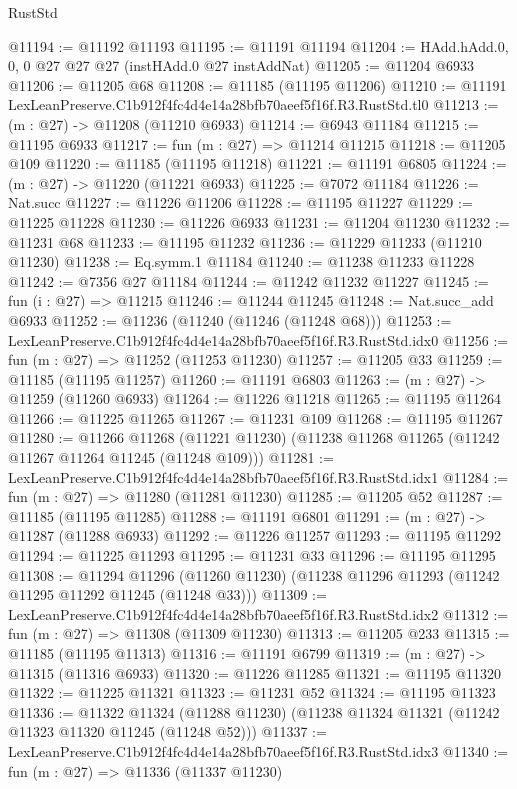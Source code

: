 \begin{lexlean}{RustStd}
\begin{coremodule}
@11194 := @11192 @11193
@11195 := @11191 @11194
@11204 := HAdd.hAdd.{0, 0, 0} @27 @27 @27 (instHAdd.{0} @27 instAddNat)
@11205 := @11204 @6933
@11206 := @11205 @68
@11208 := @11185 (@11195 @11206)
@11210 := @11191 LexLeanPreserve.C1b912f4fc4d4e14a28bfb70aeef5f16f.R3.RustStd.tl0
@11213 := (m : @27) -> @11208 (@11210 @6933)
@11214 := @6943 @11184
@11215 := @11195 @6933
@11217 := fun (m : @27) => @11214 @11215
@11218 := @11205 @109
@11220 := @11185 (@11195 @11218)
@11221 := @11191 @6805
@11224 := (m : @27) -> @11220 (@11221 @6933)
@11225 := @7072 @11184
@11226 := Nat.succ
@11227 := @11226 @11206
@11228 := @11195 @11227
@11229 := @11225 @11228
@11230 := @11226 @6933
@11231 := @11204 @11230
@11232 := @11231 @68
@11233 := @11195 @11232
@11236 := @11229 @11233 (@11210 @11230)
@11238 := Eq.symm.{1} @11184
@11240 := @11238 @11233 @11228
@11242 := @7356 @27 @11184
@11244 := @11242 @11232 @11227
@11245 := fun (i : @27) => @11215
@11246 := @11244 @11245
@11248 := Nat.succ_add @6933
@11252 := @11236 (@11240 (@11246 (@11248 @68)))
@11253 := LexLeanPreserve.C1b912f4fc4d4e14a28bfb70aeef5f16f.R3.RustStd.idx0
@11256 := fun (m : @27) => @11252 (@11253 @11230)
@11257 := @11205 @33
@11259 := @11185 (@11195 @11257)
@11260 := @11191 @6803
@11263 := (m : @27) -> @11259 (@11260 @6933)
@11264 := @11226 @11218
@11265 := @11195 @11264
@11266 := @11225 @11265
@11267 := @11231 @109
@11268 := @11195 @11267
@11280 := @11266
    @11268
    (@11221 @11230)
    (@11238 @11268 @11265 (@11242 @11267 @11264 @11245 (@11248 @109)))
@11281 := LexLeanPreserve.C1b912f4fc4d4e14a28bfb70aeef5f16f.R3.RustStd.idx1
@11284 := fun (m : @27) => @11280 (@11281 @11230)
@11285 := @11205 @52
@11287 := @11185 (@11195 @11285)
@11288 := @11191 @6801
@11291 := (m : @27) -> @11287 (@11288 @6933)
@11292 := @11226 @11257
@11293 := @11195 @11292
@11294 := @11225 @11293
@11295 := @11231 @33
@11296 := @11195 @11295
@11308 := @11294
    @11296
    (@11260 @11230)
    (@11238 @11296 @11293 (@11242 @11295 @11292 @11245 (@11248 @33)))
@11309 := LexLeanPreserve.C1b912f4fc4d4e14a28bfb70aeef5f16f.R3.RustStd.idx2
@11312 := fun (m : @27) => @11308 (@11309 @11230)
@11313 := @11205 @233
@11315 := @11185 (@11195 @11313)
@11316 := @11191 @6799
@11319 := (m : @27) -> @11315 (@11316 @6933)
@11320 := @11226 @11285
@11321 := @11195 @11320
@11322 := @11225 @11321
@11323 := @11231 @52
@11324 := @11195 @11323
@11336 := @11322
    @11324
    (@11288 @11230)
    (@11238 @11324 @11321 (@11242 @11323 @11320 @11245 (@11248 @52)))
@11337 := LexLeanPreserve.C1b912f4fc4d4e14a28bfb70aeef5f16f.R3.RustStd.idx3
@11340 := fun (m : @27) => @11336 (@11337 @11230)

\end{coremodule}
\end{lexlean}
